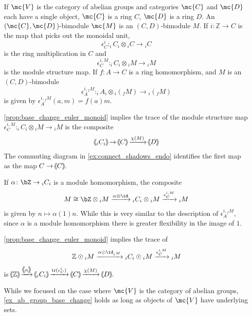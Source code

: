 \documentclass[11pt]{amsart}
\newcommand{\Z}{\mathbb{Z}}
\newcommand{\xto}{\xrightarrow}
\DeclareMathOperator{\tr}{tr}
\newcommand{\rbm}[4]{{#1}^{#2}_{#4}} %
\newcommand{\rbmm}[5]{{#1}^{{#2},{#5}}_{{#4}}} %
\def\shvar#1#2{{\ensuremath{%
  \hspace{1mm}\makebox[-1mm]{$#1\langle$}\makebox[0mm]{$#1\langle$}\hspace{1mm}%
  {#2}%
  \makebox[1mm]{$#1\rangle$}\makebox[0mm]{$#1\rangle$}%
}}}
\def\sh{\shvar{}}
\begin{document}
\begin{example}\label{ex_ab_group_base_change}
If $\mc{V}$ is the category of abelian groups and categories $\mc{C}$ and $\mc{D}$ each have  a single object, $\mc{C}$ is a ring $C$,  $\mc{D}$ is a ring $D$.  An $(\mc{C}, \mc{D}$)-bimodule $\mc{M}$ is an $(C,D)$-bimodule $M$.  
If $i\colon \Z\to C$ is the map that picks out the monoidal unit, 
\[\rbm{\epsilon}{i}{C}{C}\colon _iC_i\otimes{ _iC}\to{_iC}\] is the ring multiplication in $C$ and 
\[\rbmm{\epsilon}{i}{C}{C}{M}\colon _iC_i\otimes{ _iM}\to {_iM} \] is the module structure map.  
%
If $f\colon A\to C$ is a ring homomorphism, and $M$ is an $(C,D)$-bimodule 
\[\rbmm{\epsilon}{i}{A}{A}{_fM}\colon _iA_i\otimes{ _i({_fM})}\to {_i({_fM})} \] 
is given by 
$\rbmm{\epsilon}{i}{A}{A}{_fM}(a,m)=f(a)m$. 

\cref{prop:base_change_euler_monoid} implies the trace of the module structure map $\rbmm{\epsilon}{i}{C}{C}{M}\colon _iC_i\otimes{ _iM}\to {_iM}$ is 
the composite 
\[\sh{_iC_i}\to \sh{C}\xto{\chi(M)} \sh{D}\]
The commuting diagram in \eqref{ex:connect_shadows_endo} identifies the first map as the map $C\to \sh{C}$.

If $\alpha \colon \bZ\to {_iC_i}$ is a module homomorphism,
the composite 
\[M\cong \bZ\otimes {_iM}\xto{\alpha\otimes \id} {_iC_i}\otimes {_iM} \xto{\rbmm{\epsilon}{i}{C}{C}{M}} {_iM}\] is given by $n\mapsto \alpha(1)n$.
While this is very similar to the description of $\rbmm{\epsilon}{i}{A}{A}{_fM}$, since $\alpha$ is a module homomorphism there is greater flexibility in the image of $1$.

\cref{prop:base_change_euler_monoid} implies the trace of 
\[\Z\odot {_iM}\xto{\alpha \odot \id_{_iM}}{_iC_i}\odot {_iM}\xto{\rbmm{\epsilon}{i}{C}{C}{M} } {_iM}\]
is $\sh{\Z}\xto{\sh{\alpha}} \sh{ _iC_i}\xto{\tr(\rbm{\epsilon}{i}{C}{C})}\sh{C}\xto{\chi(M)} \sh{D}$.

\end{example}

While we focused on the case where $\mc{V}$ is the category of abelian groups, \cref{ex_ab_group_base_change} holds as long as objects of $\mc{V}$ have underlying sets.
\end{document}
